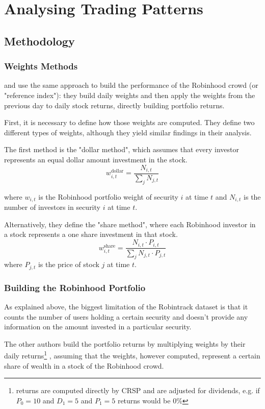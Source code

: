 \section{Analysing Trading Patterns}


\subsection{Methodology}
\subsubsection{Weights Methods} 
\cite{Fedyk2024} and \cite{Welch2022} use the same approach to build the performance of the Robinhood crowd (or "reference index"): 
they build daily weights and then apply the weights from the previous day to daily stock returns, directly building portfolio returns. 

First, it is necessary to define how those weights are computed. They define two different types of weights, although they yield similar findings in their analysis.

The first method is the "dollar method", which assumes that every investor represents an equal dollar amount investment in the stock. 
\begin{equation}
    w^{\text{dollar}}_{i,t} = \frac{N_{i,t}}{\sum_j N_{j,t}}
\end{equation}

where $w_{i,t}$ is the Robinhood portfolio weight of security $i$ at time $t$ and $N_{i,t}$ is the number of investors in security $i$ at time $t$.

Alternatively, they define the "share method", where each Robinhood investor in a stock represents a one share investment in that stock.
\begin{equation}
    w^{\text{share}}_{i,t} = \frac{N_{i,t}\cdot P_{i,t}}{\sum_j N_{j,t}\cdot P_{j,t}}
\end{equation}
where $P_{j,t}$ is the price of stock $j$ at time $t$.

\subsubsection{Building the Robinhood Portfolio}
As explained above, the biggest limitation of the Robintrack dataset is that it counts the number of users holding a certain security and doesn't provide any information on the amount invested in a particular security. 

The other authors build the portfolio returns by multiplying weights by their daily returns\footnote{returns are computed directly by CRSP and are adjusted for dividends, e.g. if $P_0=10$ and $D_1=5$ and $P_1=5$ returns would be 0\%}
, assuming that the weights, however computed, represent a certain share of wealth in a stock of the Robinhood crowd.

